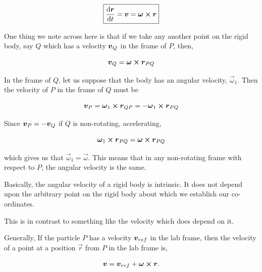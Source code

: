 \begin{equation}
    \boxed{\dv{\vec{r}}{t} = \vv = \vec{\omega} \cp \vec{r}} 
\end{equation}

One thing we note across here is that if we take any another point on 
the rigid body, say \(Q\) which has a velocity \(\boldsymbol{v}_Q\) in the frame of 
\(P\), then,

\[\vv_Q = \vec{\omega} \cp \vec{r}_{PQ}\]

In the frame of \(Q\), let us suppose that the body has an angular velocity, 
\(\vec{\omega}_1\). Then the velocity of \(P\) in the frame of \(Q\) must be 

\[\vv_P = \vec{\omega}_1 \cp \vec{r}_{QP} = -\vec{\omega}_1 \cp \vec{r}_{PQ}\]

Since \(\boldsymbol{v}_P = -\boldsymbol{v}_Q\) if \(Q\) is non-rotating, accelerating,

\[\vec{\omega}_1 \cp \vec{r}_{PQ} = \vec{\omega} \cp \vec{r}_{PQ}\]

which gives us that \(\vec{\omega}_1 = \vec{\omega}\). This means that in any 
non-rotating frame with respect to \(P\), the angular velocity is the same.

Basically, the angular velocity of a rigid body is intrinsic. It does not depend upon
the arbitrary point on the rigid body about which we establish our co-ordinates.

This is in contrast to something like the velocity which does depend on it. 

Generally, If the particle \(P\) has a velocity \(\boldsymbol{v}_{ref}\) in the lab frame,
then the velocity of a point at a position \(\vec{r}\) from \(P\) in the lab 
frame is,

\[\vv = \vv_{ref} + \vec{\omega} \cp \vec{r}.\]


